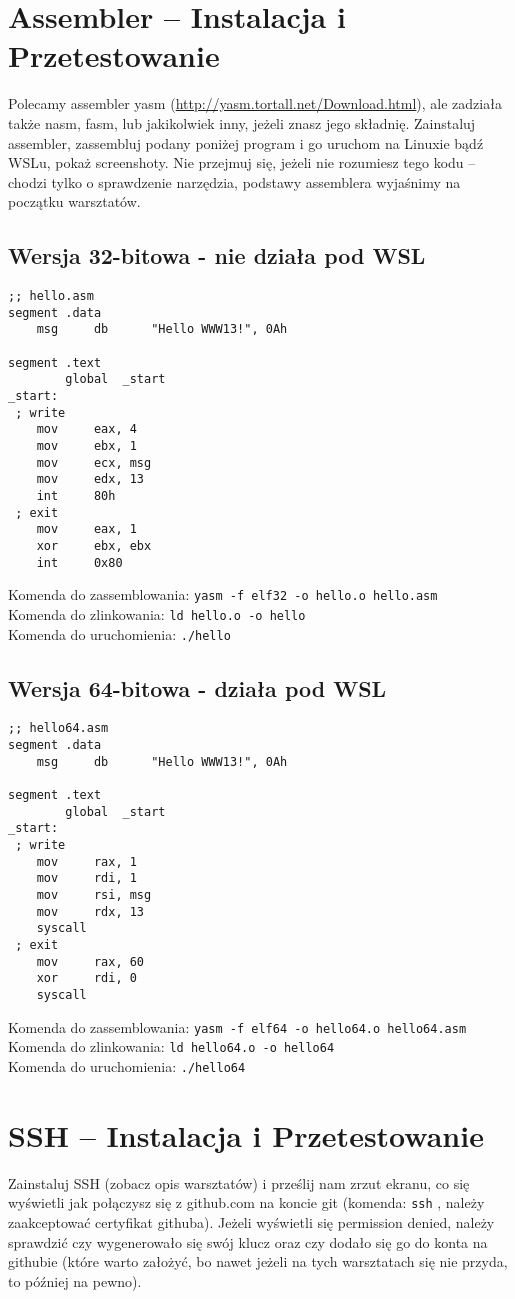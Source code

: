 \documentclass{article}
\begin{document}
\section{Assembler -- Instalacja i Przetestowanie}
Polecamy assembler yasm (\url{http://yasm.tortall.net/Download.html}), ale zadziała także nasm, fasm, lub jakikolwiek
inny, jeżeli znasz jego składnię. Zainstaluj assembler, zassembluj podany poniżej program i go uruchom na Linuxie bądź WSLu,
pokaż screenshoty. Nie przejmuj się, jeżeli nie rozumiesz tego kodu -- chodzi tylko o sprawdzenie narzędzia,
podstawy assemblera wyjaśnimy na początku warsztatów.
\subsection{Wersja 32-bitowa - nie działa pod WSL}
\begin{lstlisting}[frame=single]
;; hello.asm
segment .data
    msg     db      "Hello WWW13!", 0Ah

segment .text
        global  _start
_start:
 ; write
    mov     eax, 4
    mov     ebx, 1
    mov     ecx, msg
    mov     edx, 13
    int     80h
 ; exit
    mov     eax, 1
    xor     ebx, ebx
    int     0x80
\end{lstlisting}
Komenda do zassemblowania: \texttt{yasm -f elf32 -o hello.o hello.asm} \\
Komenda do zlinkowania: \texttt{ld hello.o -o hello} \\
Komenda do uruchomienia: \texttt{./hello} \\
\subsection{Wersja 64-bitowa - działa pod WSL}
\begin{lstlisting}[frame=single]
;; hello64.asm
segment .data
    msg     db      "Hello WWW13!", 0Ah

segment .text
        global  _start
_start:
 ; write
    mov     rax, 1
    mov     rdi, 1
    mov     rsi, msg
    mov     rdx, 13
    syscall
 ; exit
    mov     rax, 60
    xor     rdi, 0
    syscall
\end{lstlisting}
Komenda do zassemblowania: \texttt{yasm -f elf64 -o hello64.o hello64.asm} \\
Komenda do zlinkowania: \texttt{ld hello64.o -o hello64} \\
Komenda do uruchomienia: \texttt{./hello64} \\

\section{SSH -- Instalacja i Przetestowanie}
Zainstaluj SSH (zobacz opis warsztatów) i prześlij nam zrzut ekranu, co się wyświetli jak połączysz się z github.com na
koncie git (komenda: \texttt{ssh} , należy zaakceptować certyfikat githuba).
Jeżeli wyświetli się permission denied, należy sprawdzić czy wygenerowało się swój klucz oraz czy dodało się go do
konta na githubie (które warto założyć, bo nawet jeżeli na tych warsztatach się nie przyda, to później na pewno).
\end{document}
